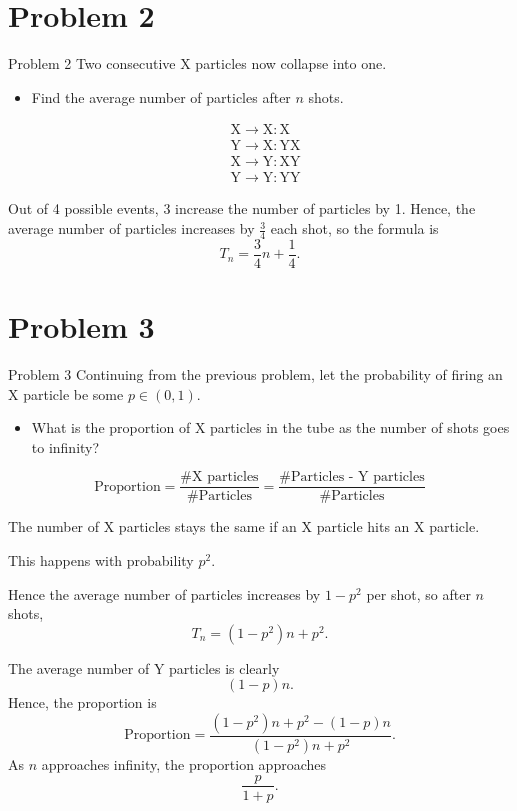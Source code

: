 \documentclass[xcolor={usenames,dvipsnames}]{beamer}
\begin{document}
\section{Problem 2}
\begin{frame}{Problem 2}
  Two consecutive X particles now collapse into one. 
  \begin{itemize}
    \item Find the average number of particles after $n$ shots.
  \end{itemize}
  \begin{figure}[H]
    \vspace{-1.5em}
    \begin{align*}
    &\text{X} \to \text{X}: \text{X} \\
    &\text{Y} \to \text{X}: \text{YX} \\
    &\text{X} \to \text{Y}: \text{XY} \\
    &\text{Y} \to \text{Y}: \text{YY}
    \end{align*}
  \end{figure}
  Out of 4 possible events, 3 increase the number of particles by 1. Hence, the average number of particles increases by $\frac{3}{4}$ each shot, so the formula is \[
    T_n = \frac{3}{4}n + \frac{1}{4}
  .\] 
\end{frame}

\section{Problem 3}
\begin{frame}{Problem 3}
  Continuing from the previous problem, let the probability of firing an X particle be some  $p \in (0, 1)$.
  \begin{itemize}
    \item What is the proportion of X particles in the tube as the number of shots goes to infinity?
  \end{itemize}
  \vspace{1cm}
  \begin{equation*}
    \text{Proportion} = \frac{\#\text{X particles}}{\#\text{Particles}} = \frac{\#\text{Particles - Y particles}}{\#\text{Particles}}
  \end{equation*}
\end{frame}

\begin{frame}
  The number of X particles stays the same if an X particle hits an X particle.

  This happens with probability $p^2$.

  Hence the average number of particles increases by $1-p^2$ per shot, so after $n$ shots,  \[
    T_n = (1-p^2)n + p^2
  .\] 
\end{frame}
\begin{frame}
  The average number of Y particles is clearly \[
    (1-p)n
  .\] Hence, the proportion is 
  \begin{equation*}
    \text{Proportion} = \frac{(1-p^2)n + p^2 - (1-p)n}{(1-p^2)n + p^2}.
\end{equation*}
As $n$ approaches infinity, the proportion approaches \[
  \frac{p}{1+p}
.\] 
\end{frame}
\end{document}
